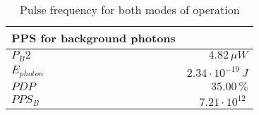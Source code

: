 \begin{table}[H]
\centering
\caption{Pulse frequency for both modes of operation}
\label{tab:PPS}
\begin{tabular}{|l|r|}\hline
    \textbf{PPS for background photons} & \\
    \hline 
    $P_B2$ & $4.82\,\mu W$ \\
    $E_{photon}$ & $2.34\cdot10^{-19}\,J$ \\
    $PDP$ & $35.00\, \%$ \\
    $PPS_B$ & $7.21\cdot10^{12}\,$ \\
    \hline 
\end{tabular}
\end{table}
